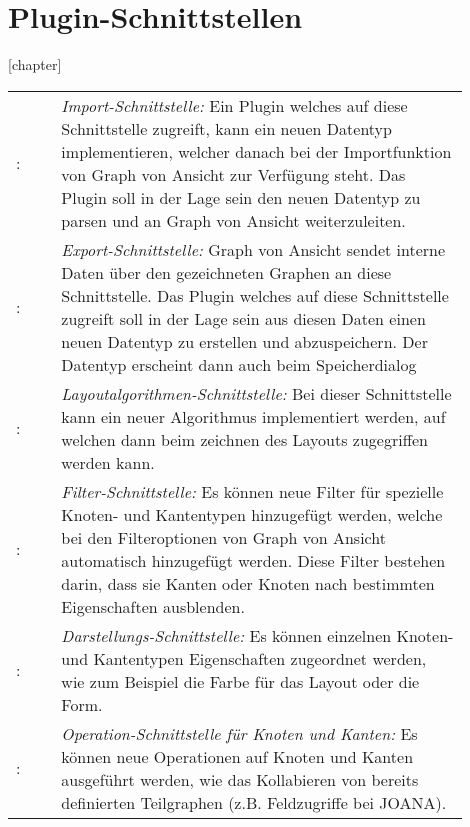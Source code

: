 \chapter{Plugin-Schnittstellen}
\label{ch:plugschnitt}

[chapter]
\setcounter{psnr}{10}
\newcommand{\psno}{\ifnum\value{psnr}<10 00\else\ifnum\value{psnr}<100 0\fi\fi\arabic{psnr}\addtocounter{psnr}{10}}
\renewcommand\thesubsubsection{/S\ifnum\value{psnr}<10 000\else\ifnum\value{psnr}<100 00\else\ifnum\value{psnr}<1000 0\fi\fi\fi\arabic{psnr}/}
\newcommand\ps[2]{\namedlabel{s:#1}{\textbf{/S\psno/}}: & #2 \\ [1ex] }

\begin{tabular}{lp{0.9\linewidth}}
  \ps{import}{\textit{Import-Schnittstelle:} Ein Plugin welches auf diese Schnittstelle zugreift, kann ein neuen Datentyp implementieren, welcher danach bei der Importfunktion von Graph von Ansicht zur Verfügung steht. Das Plugin soll in der Lage sein den neuen Datentyp zu parsen und an Graph von Ansicht weiterzuleiten.}
  \ps{export}{\textit{Export-Schnittstelle:} Graph von Ansicht sendet interne Daten über den gezeichneten Graphen an diese Schnittstelle. Das Plugin welches auf diese Schnittstelle zugreift soll in der Lage sein aus diesen Daten einen neuen Datentyp zu erstellen und abzuspeichern. Der Datentyp erscheint dann auch beim Speicherdialog}
  \ps{layoutalgo}{\textit{Layoutalgorithmen-Schnittstelle:} Bei dieser Schnittstelle kann ein neuer Algorithmus implementiert werden, auf welchen dann beim zeichnen des Layouts zugegriffen werden kann.}
  \ps{filter}{\textit{Filter-Schnittstelle:} Es können neue Filter für spezielle Knoten- und Kantentypen hinzugefügt werden, welche bei den Filteroptionen von Graph von Ansicht automatisch hinzugefügt werden. Diese Filter bestehen darin, dass sie Kanten oder Knoten nach bestimmten Eigenschaften ausblenden.}
  \ps{darstellung}{\textit{Darstellungs-Schnittstelle:} Es können einzelnen Knoten- und Kantentypen Eigenschaften zugeordnet werden, wie zum Beispiel die Farbe für das Layout oder die Form.}
  \ps{operationen}{\textit{Operation-Schnittstelle für Knoten und Kanten:} Es können neue Operationen auf Knoten und Kanten ausgeführt werden, wie das Kollabieren von bereits definierten Teilgraphen (z.B. Feldzugriffe bei JOANA).}
\end{tabular}